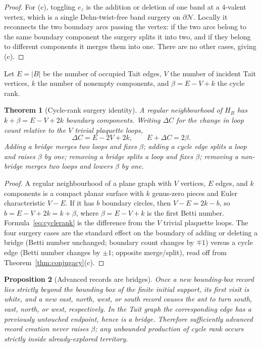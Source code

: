 \documentclass[11pt,letterpaper]{article}
\theoremstyle{plain}
\newtheorem{theorem}{Theorem}[section]
\newtheorem{proposition}[theorem]{Proposition}
\theoremstyle{definition}
\begin{document}
\begin{NoHyper}
\begin{proof}
For (c), toggling $e_z$ is the addition or deletion of one band at a $4$-valent
vertex, which is a single Dehn-twist-free band surgery on $\partial\mathcal{N}$. Locally it
reconnects the two boundary arcs passing the vertex: if the two arcs belong to the same
boundary component the surgery splits it into two, and if they belong to different
components it merges them into one. There are no other cases, giving (c).
\end{proof}

Let $E=|B|$ be the number of occupied Tait edges, $V$ the number of incident Tait
vertices, $k$ the number of nonempty components, and $\beta=E-V+k$ the cycle rank.

\begin{theorem}[Cycle-rank surgery identity]\label{thm:cyclerank}
A regular neighbourhood of $H_B$ has $k+\beta=E-V+2k$ boundary components. Writing
$\Delta C$ for the change in loop count relative to the $V$ trivial plaquette loops,
\begin{equation}\label{eq:cyclerank}
\Delta C=E-2V+2k,\qquad E+\Delta C=2\beta .
\end{equation}
Adding a bridge merges two loops and fixes $\beta$; adding a cycle edge splits a loop
and raises $\beta$ by one; removing a bridge splits a loop and fixes $\beta$;
removing a non-bridge merges two loops and lowers $\beta$ by one.
\end{theorem}

\begin{proof}
A regular neighbourhood of a plane graph with $V$ vertices, $E$ edges, and $k$
components is a compact planar surface with $k$ genus-zero pieces and Euler
characteristic $V-E$. If it has $b$ boundary circles, then $V-E=2k-b$, so
$b=E-V+2k=k+\beta$, where $\beta=E-V+k$ is the first Betti number.
Formula~\eqref{eq:cyclerank} is the difference from the $V$ trivial plaquette loops.
The four surgery cases are the standard effect on the boundary of adding or deleting
a bridge (Betti number unchanged; boundary count changes by $\mp1$) versus a cycle
edge (Betti number changes by $\pm1$; opposite merge/split), read off from
Theorem~\ref{thm:conjugacy}(c).
\end{proof}

\begin{proposition}[Advanced records are bridges]\label{prop:record}
Once a new bounding-box record lies strictly beyond the bounding box of the finite
initial support, its first visit is white, and a new east, north, west, or south
record causes the ant to turn south, east, north, or west, respectively. In the
Tait graph the corresponding edge has a previously untouched endpoint, hence is a
bridge. Therefore sufficiently advanced record creation never raises $\beta$; any
unbounded production of cycle rank occurs strictly inside already-explored territory.
\end{proposition}


\end{NoHyper}
\end{document}
